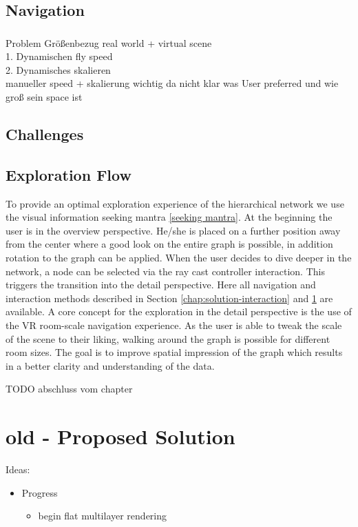 \section{Navigation }
\label{chap:solution-navigation}

\subsection{}
Problem Größenbezug real world + virtual scene\\
1. Dynamischen fly speed\\
2. Dynamisches skalieren\\
manueller speed + skalierung wichtig da nicht klar was User preferred und wie groß sein space ist\\ 
\section{Challenges}




\section{Exploration Flow}
To provide an optimal exploration experience of the hierarchical network we use the visual information seeking mantra \ref{seeking mantra}. 
At the beginning the user is in the overview perspective. He/she is placed on a further position away from the center where a good look on the entire graph is possible, in addition rotation to the graph can be applied.
When the user decides to dive deeper in the network, a node can be selected via the ray cast controller interaction. This triggers the transition into the detail perspective. 
Here all navigation and interaction methods described in Section \ref{chap:solution-interaction} and \ref{chap:solution-navigation}
are available. 
A core concept for the exploration in the detail perspective is the use of the VR room-scale navigation experience. As the user is able to tweak the scale of the scene to their liking, walking around the graph is possible for different room sizes. The goal is to improve spatial impression of the graph which results in a better clarity and understanding of the data.

TODO abschluss vom chapter

\chapter{old - Proposed Solution}
Ideas:
\begin{itemize}
    \item Progress
        \begin{itemize}
            \item begin flat multilayer rendering
        \end{itemize}
\end{itemize}

